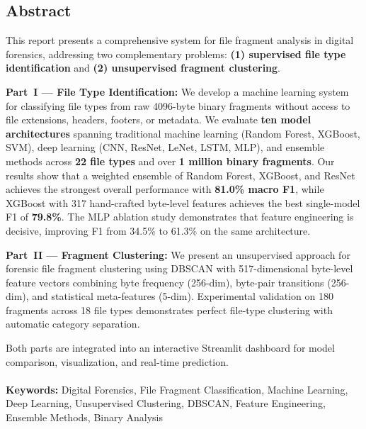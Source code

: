 \documentclass[12pt,a4paper]{report}
\begin{document}
\newpage
\pagestyle{plain}
\begin{center}
    \begin{LARGE}
        \section*{Abstract}
    \end{LARGE}
\end{center}
\begin{normalsize}
{\setlength{\baselineskip}{1.1\baselineskip}
\noindent
This report presents a comprehensive system for file fragment analysis in digital forensics, addressing two complementary problems: \textbf{(1) supervised file type identification} and \textbf{(2) unsupervised fragment clustering}.

\textbf{Part~I --- File Type Identification:} We develop a machine learning system for classifying file types from raw 4096-byte binary fragments without access to file extensions, headers, footers, or metadata. We evaluate \textbf{ten model architectures} spanning traditional machine learning (Random Forest, XGBoost, SVM), deep learning (CNN, ResNet, LeNet, LSTM, MLP), and ensemble methods across \textbf{22 file types} and over \textbf{1 million binary fragments}. Our results show that a weighted ensemble of Random Forest, XGBoost, and ResNet achieves the strongest overall performance with \textbf{81.0\% macro F1}, while XGBoost with 317 hand-crafted byte-level features achieves the best single-model F1 of \textbf{79.8\%}. The MLP ablation study demonstrates that feature engineering is decisive, improving F1 from 34.5\% to 61.3\% on the same architecture.

\textbf{Part~II --- Fragment Clustering:} We present an unsupervised approach for forensic file fragment clustering using DBSCAN with 517-dimensional byte-level feature vectors combining byte frequency (256-dim), byte-pair transitions (256-dim), and statistical meta-features (5-dim). Experimental validation on 180 fragments across 18 file types demonstrates perfect file-type clustering with automatic category separation.

Both parts are integrated into an interactive Streamlit dashboard for model comparison, visualization, and real-time prediction.\\\\
\textbf{Keywords:} Digital Forensics, File Fragment Classification, Machine Learning, Deep Learning, Unsupervised Clustering, DBSCAN, Feature Engineering, Ensemble Methods, Binary Analysis\\\\
\par}
\end{normalsize}
\end{document}
